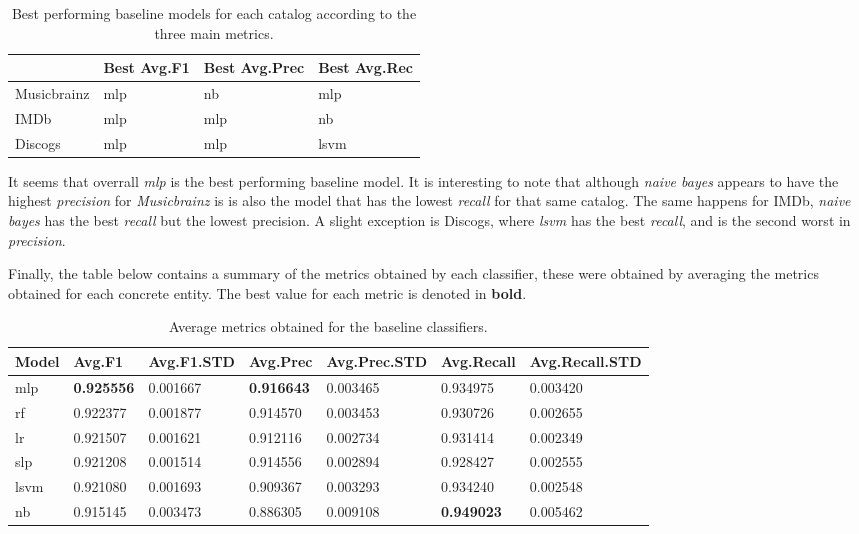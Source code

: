 \documentclass[epsfig,a4paper,11pt,titlepage,twoside,openany]{book}
\begin{document}
\begin{table}[H]
\centering
\begin{tabular}{l|l|l|l}
                                  & Best Avg.F1 & Best Avg.Prec & Best Avg.Rec \\ \hline
\multicolumn{1}{l|}{Musicbrainz} & mlp    & nb       & mlp     \\ \hline
\multicolumn{1}{l|}{IMDb}        & mlp    & mlp      & nb      \\ \hline
\multicolumn{1}{l|}{Discogs}     & mlp    & mlp      & lsvm    \\ 
\end{tabular}
\caption{Best performing baseline models for each catalog according to the three main metrics.}
\label{tab:best-model-per-metric-average}
\end{table}

It seems that overrall \textit{mlp} is the best performing baseline model. It is interesting to note that although \textit{naive bayes} appears to have the highest \textit{precision} for \textit{Musicbrainz} is is also the model that has the lowest \textit{recall} for that same catalog. The same happens for IMDb, \textit{naive bayes} has the best \textit{recall} but the lowest precision. A slight exception is Discogs, where \textit{lsvm} has the best \textit{recall}, and is the second worst in \textit{precision}.



Finally, the table below contains a summary of the metrics obtained by each classifier, these were obtained by averaging the metrics obtained for each concrete entity. The best value for each metric is denoted in \textbf{bold}.

\begin{table}[H]
\centering
\begin{tabular}{l|l|l|l|l|l|l}
Model & Avg.F1   & Avg.F1.STD & Avg.Prec & Avg.Prec.STD & Avg.Recall & Avg.Recall.STD \\ \hline
mlp   & \textbf{0.925556} & 0.001667   & \textbf{0.916643} & 0.003465     & 0.934975   & 0.003420       \\
rf    & 0.922377 & 0.001877   & 0.914570 & 0.003453     & 0.930726   & 0.002655       \\
lr    & 0.921507 & 0.001621   & 0.912116 & 0.002734     & 0.931414   & 0.002349       \\
slp   & 0.921208 & 0.001514   & 0.914556 & 0.002894     & 0.928427   & 0.002555       \\
lsvm  & 0.921080 & 0.001693   & 0.909367 & 0.003293     & 0.934240   & 0.002548       \\
nb    & 0.915145 & 0.003473   & 0.886305 & 0.009108     & \textbf{0.949023}   & 0.005462          
\end{tabular}
\caption{Average metrics obtained for the baseline classifiers.}
\label{tab:metrics-summary-baseline}
\end{table}
\end{document}
